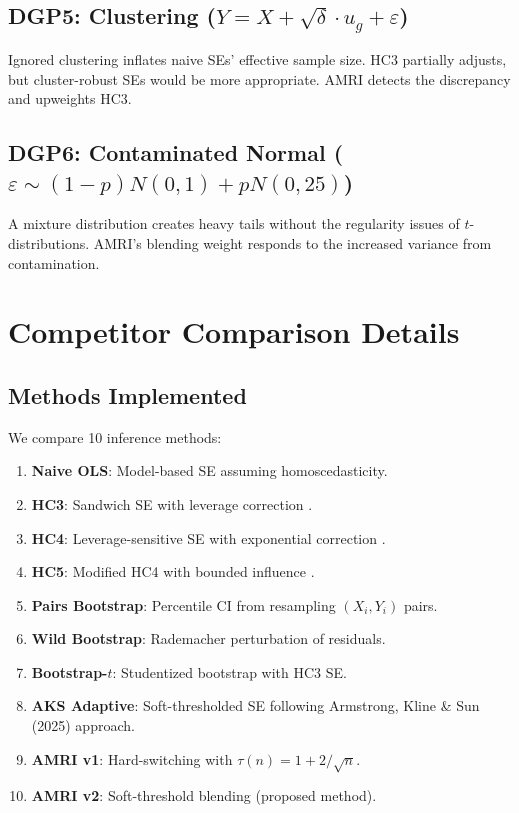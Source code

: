 \documentclass[12pt]{article}
\theoremstyle{definition}
\theoremstyle{remark}
\begin{document}
\subsection{DGP5: Clustering ($Y = X + \sqrt{\delta} \cdot u_g + \varepsilon$)}

Ignored clustering inflates naive SEs' effective sample size. HC3 partially
adjusts, but cluster-robust SEs would be more appropriate. AMRI detects
the discrepancy and upweights HC3.

\subsection{DGP6: Contaminated Normal ($\varepsilon \sim (1-p)N(0,1) + pN(0,25)$)}

A mixture distribution creates heavy tails without the regularity issues of
$t$-distributions. AMRI's blending weight responds to the increased
variance from contamination.


\section{Competitor Comparison Details}
\label{sec:supp_competitors}

\subsection{Methods Implemented}

We compare 10 inference methods:

\begin{enumerate}
\item \textbf{Naive OLS}: Model-based SE assuming homoscedasticity.
\item \textbf{HC3}: Sandwich SE with leverage correction \citep{mackinnon1985some}.
\item \textbf{HC4}: Leverage-sensitive SE with exponential correction \citep{cribari2004asymptotic}.
\item \textbf{HC5}: Modified HC4 with bounded influence \citep{cribari2011new}.
\item \textbf{Pairs Bootstrap}: Percentile CI from resampling $(X_i, Y_i)$ pairs.
\item \textbf{Wild Bootstrap}: Rademacher perturbation of residuals.
\item \textbf{Bootstrap-$t$}: Studentized bootstrap with HC3 SE.
\item \textbf{AKS Adaptive}: Soft-thresholded SE following Armstrong, Kline \& Sun (2025) approach.
\item \textbf{AMRI v1}: Hard-switching with $\tau(n) = 1 + 2/\sqrt{n}$.
\item \textbf{AMRI v2}: Soft-threshold blending (proposed method).
\end{enumerate}
\end{document}
